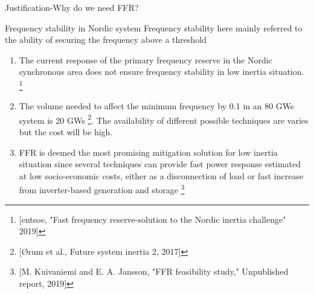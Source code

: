 \documentclass{beamer}
\begin{document}
\begin{frame}{Justification-Why do we need FFR?}
\begin{block}{Frequency stability in Nordic system}
Frequency stability here mainly referred to the ability of securing the frequency above a threshold
\end{block}

\begin{enumerate}

\item<1-> The current response of the primary frequency reserve in the Nordic synchronous area does not ensure frequency stability in low inertia situation. \footnote{{\tiny[entsoe, "Fast frequency reserve-solution to the Nordic inertia challenge" 2019]}}
\item<2->  The volume needed to affect the minimum frequency by 0.1 in an 80 GWs system is 20 GWs \footnote{{\tiny[Ørum et al., Future system inertia 2, 2017]}}. The availability of different possible techniques are varies but the cost will be high.  
\item<3-> FFR is deemed the most promising mitigation solution for low inertia situation since several techniques can provide fast power response estimated at low socio-economic costs, either as a disconnection of load or fast increase from inverter-based generation and storage  \footnote{{\tiny[M. Kuivaniemi and E. A. Jansson, "FFR feasibility study," Unpublished report, 2019]}} 
\end{enumerate}
\end{frame}
\end{document}
